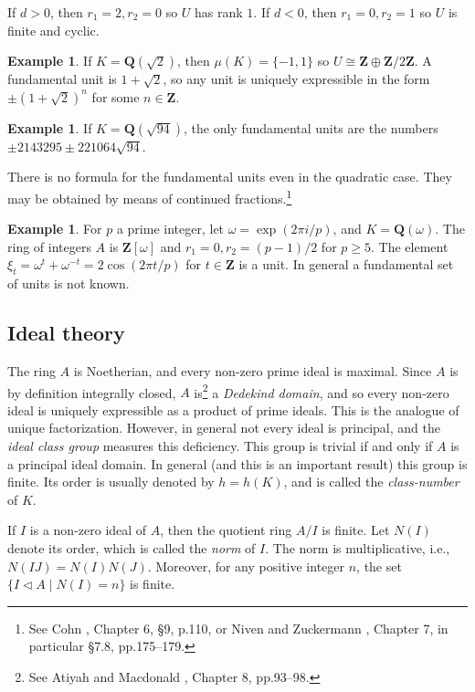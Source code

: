 \documentclass[10pt]{article}
\theoremstyle{definition}
\newtheorem{exam}[theo]{Example}
\def\ZZ{\mathbf{Z}}
\def\QQ{\mathbf{Q}}
\newcommand{\tri}{\mathbin{\triangleleft}}
\def\fnonfi{See Cohn \cite{bib:36}, Chapter 6, \S9, p.110, or Niven and Zuckermann \cite{bib:148}, Chapter 7, in particular \S7.8, pp.175--179.}
\def\fnonsi{See Atiyah and Macdonald \cite{bib:17}, Chapter 8, pp.93--98.}
\begin{document}
If $d > 0$, then $r_1 = 2, r_2 = 0$ so $U$ has rank $1$.
If $d < 0$, then $r_1 = 0, r_2 = 1$ so $U$ is finite and cyclic.


\begin{exam}
\label{2.1.2}
If $K = \QQ(\sqrt 2)$, then $\mu(K) = \{-1,1\}$ so $U \cong \ZZ \oplus \ZZ / 2 \ZZ$.
A fundamental unit is $1 + \sqrt 2$, so any unit is uniquely expressible in the form $\pm(1 + \sqrt 2)^n$ for some $n \in \ZZ$.
\end{exam}


\begin{exam}
\label{2.1.3}
If $K = \QQ(\sqrt{94})$, the only fundamental units are the numbers $\pm 2143295 \pm 221064 \sqrt{94}$.
\end{exam}

There is no formula for the fundamental units even in the quadratic case.
They may be obtained by means of continued fractions.\footnote{\fnonfi}


\begin{exam}
For $p$ a prime integer, let $\omega = \exp(2 \pi i / p)$, and $K = \QQ(\omega)$.
The ring of integers $A$ is $\ZZ[\omega]$ and $r_1 = 0, r_2 = (p-1)/2$ for $p \geq 5$.
The element $\xi_t = \omega^t + \omega^{-t} = 2\cos(2 \pi t / p)$ for $t \in \ZZ$ is a unit.
In general a fundamental set of units is not known.
\end{exam}


\subsection{Ideal theory}
\label{ch:2.2}

The ring $A$ is Noetherian, and every non-zero prime ideal is maximal.
Since $A$ is by definition integrally closed, $A$ is\footnote{\fnonsi} a \emph{Dedekind domain}, and so every non-zero ideal is uniquely expressible as a product of prime ideals.
This is the analogue of unique factorization.
However, in general not every ideal is principal, and the \emph{ideal class group} measures this deficiency.
This group is trivial if and only if $A$ is a principal ideal domain.
In general (and this is an important result) this group is finite.
Its order is usually denoted by $h = h(K)$, and is called the \emph{class-number} of $K$.

If $I$ is a non-zero ideal of $A$, then the quotient ring $A / I$ is finite.
Let $N(I)$ denote its order, which is called the \emph{norm} of $I$.
The norm is multiplicative, i.e., $N(IJ) = N(I) N(J)$.
Moreover, for any positive integer $n$, the set $\{ I \tri A \mid N(I) = n\}$ is finite.
\end{document}
